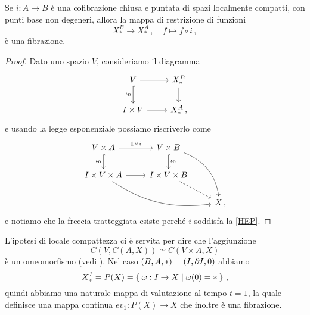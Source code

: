 \begin{prop}
	Se $i:A \to B$ è una cofibrazione chiusa e puntata 
	di spazi localmente compatti,
	con punti base non degeneri, allora la mappa di restrizione di funzioni
	\begin{equation*}
		X_{*}^{B} \longrightarrow X_{*}^{A}\,,
		\quad f \longmapsto f \circ i\,,
	\end{equation*}
	è una fibrazione.
	\begin{proof}
		Dato uno spazio $V$, consideriamo il diagramma
		\begin{equation*}
			\begin{tikzcd}
				V \ar[r] \ar[d, "\iota_{0}"', hook] & X_{*}^{B} \ar[d] \\
				I \times V \ar[r] & X_{*}^{A}\,,
			\end{tikzcd}
		\end{equation*}
		e usando la legge esponenziale possiamo riscriverlo come
		\begin{equation*}
			\begin{tikzcd}
				V \times A \ar[r, "\cat{1} \times i"] \ar[d, "\iota_{0}"', hook] 
				& V \times B \ar[d, "\iota_{0}", hook] \ar[rdd, bend left] & \\
				I \times V \times A \ar[r] \ar[rrd, bend right=20]
				& I \times V \times B  \ar[dr, dashed] & \\
				& & X \,,
			\end{tikzcd}
		\end{equation*}
		e notiamo che la freccia tratteggiata esiste perché $i$ soddisfa la \eqref{HEP}.
	\end{proof}
\end{prop}

\begin{oss}
	L'ipotesi di locale compattezza ci è servita
	per dire che l'aggiunzione
	\begin{equation*}
		C(V,C(A,X)) \simeq C(V \times A,X)
	\end{equation*}
	è un omeomorfismo (vedi \parencite[2.4]{tomdieck}).
	Nel caso $(B,A,\ast) = (I,\partial I, 0)$ abbiamo
	\begin{equation*}
		X^{I}_{\ast} = P(X) = \Set{\omega:I \to X | \omega(0) = \ast}\,,
	\end{equation*}
	quindi abbiamo una naturale mappa di valutazione al tempo $t=1$,
	la quale definisce una mappa continua $ev_{1} : P(X) \to X$ che inoltre
	è una fibrazione.
\end{oss}


